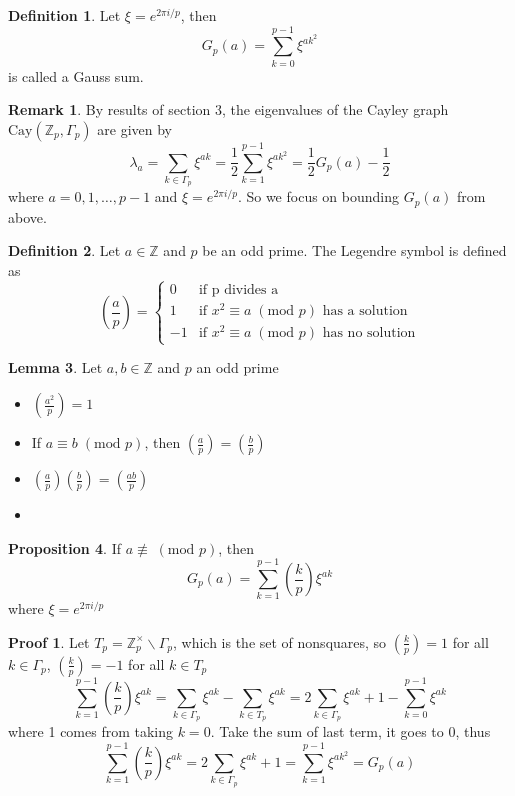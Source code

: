 \documentclass{book}
\newcommand{\Z}{\mathbb{Z}}
\newcommand{\Cay}[1]{\textrm{Cay}( #1 )}
\newcommand{\Mod}[1]{\;(\textrm{mod } #1 )}
\theoremstyle{definition}
\newtheorem{lemma}{Lemma}[chapter]
\newtheorem{proposition}[lemma]{Proposition}
\newtheorem{definition}[lemma]{Definition}
\theoremstyle{remarkstyle}
\newtheorem*{remark}{Remark}%
\newtheorem*{myproof}{Proof}%
\begin{document}
\begin{definition}
    Let $\xi=e^{2\pi i/p} $, then 
    $$
    G_p(a) = \sum^{p-1}_{k=0}\xi^{ak^2}
    $$
    is called a Gauss sum.
\end{definition}
\begin{remark}
    By results of section 3, the eigenvalues of the Cayley graph $\Cay{\Z_p,\Gamma_p}$ are given by 
    $$
    \lambda_a = \sum_{k\in\Gamma_p}\xi^{ak} = \frac{1}{2}\sum^{p-1}_{k=1}\xi^{ak^2}=\frac{1}{2}G_p(a) - \frac{1}{2}
    $$
    where $a=0,1,\dots,p-1$ and $\xi = e^{2\pi i/p} $. So we focus on bounding $G_p(a)$ from above. \newline
\end{remark}

\begin{definition}
    Let $a\in\Z$ and $p$ be an odd prime. The Legendre symbol is defined as 
    $$
    \left( \frac{a}{p} \right) = 
    \left\{
    \begin{array}{ll}
        0 & \textrm{if p divides a}  \\
        1 & \textrm{if $x^2\equiv a\Mod{p}$ has a solution} \\ 
        -1 & \textrm{if $x^2\equiv a\Mod{p}$ has no solution}
    \end{array}
    \right.
    $$\newline
\end{definition}

\begin{lemma}
    Let $a,b\in\Z$ and $p$ an odd prime
    \begin{itemize}
        \item $\left(\frac{a^2}{p}\right)=1$
        \item If $a\equiv b\Mod{p}$, then $\left(\frac{a}{p}\right)=\left(\frac{b}{p}\right)$
        \item $\left(\frac{a}{p}\right)\left(\frac{b}{p}\right)=\left(\frac{ab}{p}\right)$
        \item[] 
    \end{itemize}
\end{lemma}

\begin{proposition}
    If $a\not\equiv \Mod{p}$, then 
    $$
    G_p(a) = \sum^{p-1}_{k=1}\left(\frac{k}{p}\right)\xi^{ak}
    $$
    where $\xi = e^{2\pi i/p} $
\end{proposition}
\begin{myproof}
    Let $T_p=\Z^\times_p\backslash\Gamma_p$, which is the set of nonsquares, so $\left(\frac{k}{p}\right)=1$ for all $k\in\Gamma_p$, $\left(\frac{k}{p}\right)=-1$ for all $k\in T_p$
    $$
    \sum^{p-1}_{k=1}\left(\frac{k}{p}\right)\xi^{ak} = \sum_{k\in\Gamma_p}\xi^{ak}-\sum_{k\in T_p}\xi^{ak} = 2\sum_{k\in\Gamma_p}\xi^{ak} + 1 - \sum^{p-1}_{k=0}\xi^{ak}
    $$
    where 1 comes from taking $k=0$. Take the sum of last term, it goes to 0, thus 
    $$
    \sum^{p-1}_{k=1}\left(\frac{k}{p}\right)\xi^{ak} = 2\sum_{k\in\Gamma_p}\xi^{ak} + 1 = \sum^{p-1}_{k=1}\xi^{ak^2} = G_p(a)
    $$\newline
\end{myproof}
\end{document}
